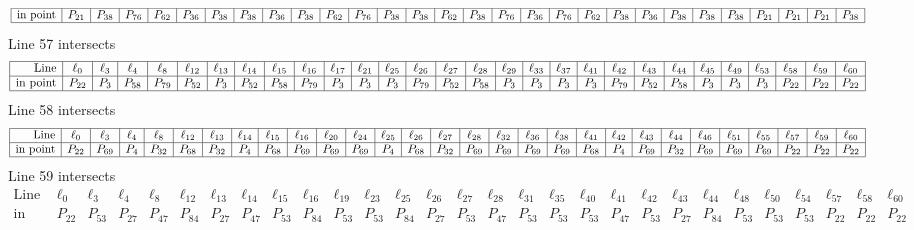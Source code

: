 \documentclass{article}
\begin{document}
{$$\begin{array}{|r*{28}{|c}|}
\hline
\mbox{in point}  & P_{21} & P_{38} & P_{76} & P_{62} & P_{36} & P_{38} & P_{38} & P_{36} & P_{38} & P_{62} & P_{76} & P_{38} & P_{38} & P_{62} & P_{38} & P_{76} & P_{36} & P_{76} & P_{62} & P_{38} & P_{36} & P_{38} & P_{38} & P_{38} & P_{21} & P_{21} & P_{21} & P_{38}\\
\hline
\end{array}
$$
Line 57 intersects 
$$
\begin{array}{|r*{28}{|c}|}
\hline
\mbox{Line}  & \ell_{0} & \ell_{3} & \ell_{4} & \ell_{8} & \ell_{12} & \ell_{13} & \ell_{14} & \ell_{15} & \ell_{16} & \ell_{17} & \ell_{21} & \ell_{25} & \ell_{26} & \ell_{27} & \ell_{28} & \ell_{29} & \ell_{33} & \ell_{37} & \ell_{41} & \ell_{42} & \ell_{43} & \ell_{44} & \ell_{45} & \ell_{49} & \ell_{53} & \ell_{58} & \ell_{59} & \ell_{60}\\
\hline
\mbox{in point}  & P_{22} & P_{3} & P_{58} & P_{79} & P_{52} & P_{3} & P_{52} & P_{58} & P_{79} & P_{3} & P_{3} & P_{3} & P_{79} & P_{52} & P_{58} & P_{3} & P_{3} & P_{3} & P_{3} & P_{79} & P_{52} & P_{58} & P_{3} & P_{3} & P_{3} & P_{22} & P_{22} & P_{22}\\
\hline
\end{array}
$$
Line 58 intersects 
$$
\begin{array}{|r*{28}{|c}|}
\hline
\mbox{Line}  & \ell_{0} & \ell_{3} & \ell_{4} & \ell_{8} & \ell_{12} & \ell_{13} & \ell_{14} & \ell_{15} & \ell_{16} & \ell_{20} & \ell_{24} & \ell_{25} & \ell_{26} & \ell_{27} & \ell_{28} & \ell_{32} & \ell_{36} & \ell_{38} & \ell_{41} & \ell_{42} & \ell_{43} & \ell_{44} & \ell_{46} & \ell_{51} & \ell_{55} & \ell_{57} & \ell_{59} & \ell_{60}\\
\hline
\mbox{in point}  & P_{22} & P_{69} & P_{4} & P_{32} & P_{68} & P_{32} & P_{4} & P_{68} & P_{69} & P_{69} & P_{69} & P_{4} & P_{68} & P_{32} & P_{69} & P_{69} & P_{69} & P_{69} & P_{68} & P_{4} & P_{69} & P_{32} & P_{69} & P_{69} & P_{69} & P_{22} & P_{22} & P_{22}\\
\hline
\end{array}
$$
Line 59 intersects 
$$
\begin{array}{|r*{28}{|c}|}
\hline
\mbox{Line}  & \ell_{0} & \ell_{3} & \ell_{4} & \ell_{8} & \ell_{12} & \ell_{13} & \ell_{14} & \ell_{15} & \ell_{16} & \ell_{19} & \ell_{23} & \ell_{25} & \ell_{26} & \ell_{27} & \ell_{28} & \ell_{31} & \ell_{35} & \ell_{40} & \ell_{41} & \ell_{42} & \ell_{43} & \ell_{44} & \ell_{48} & \ell_{50} & \ell_{54} & \ell_{57} & \ell_{58} & \ell_{60}\\
\hline
\mbox{in point}  & P_{22} & P_{53} & P_{27} & P_{47} & P_{84} & P_{27} & P_{47} & P_{53} & P_{84} & P_{53} & P_{53} & P_{84} & P_{27} & P_{53} & P_{47} & P_{53} & P_{53} & P_{53} & P_{47} & P_{53} & P_{27} & P_{84} & P_{53} & P_{53} & P_{53} & P_{22} & P_{22} & P_{22}\\

\end{array}$$}
\end{document}
